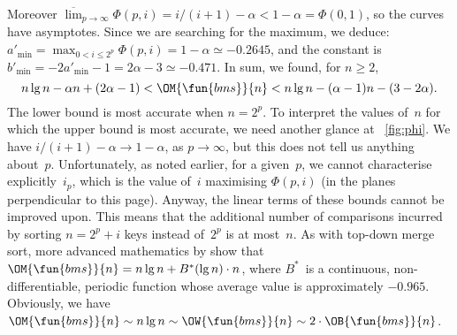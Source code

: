 Moreover \(\overline\lim_{p \to \infty}\Phi(p,i) = i/(i+1) - \alpha <
1 - \alpha = \Phi(0,1)\), so the curves have asymptotes. Since we are
searching for the maximum, we deduce: \(a'_{\min} = \max_{0 < i
  \leqslant 2^p}\Phi(p,i) = 1 - \alpha \simeq -0.2645\), and the
constant is \(b'_{\min} = -2a'_{\min} - 1 = 2\alpha - 3 \simeq
-0.471\). In sum, we found, for \(n \geqslant 2\),
\begin{equation}
n\lg n - \alpha n + (2\alpha - 1) < \OM{\fun{bms}}{n}
< n\lg n - (\alpha - 1)n - (3 - 2\alpha).
\label{ineq:bounds_Mbms}
\end{equation}
The lower bound is most accurate when \(n=2^p\). To interpret the
values of~\(n\) for which the upper bound is most accurate, we need
another glance at \fig~\vref{fig:phi}. We have \(i/(i+1) - \alpha \to
1 - \alpha\), as \(p \to \infty\), but this does not tell us anything
about~\(p\). Unfortunately, as noted earlier, for a given~\(p\), we
cannot characterise explicitly~\(i_p\), which is the value of~\(i\)
maximising \(\Phi(p,i)\) (in the planes perpendicular to this
page). Anyway, the linear terms of these bounds cannot be improved
upon. This means that the additional number of comparisons incurred by
sorting \(n=2^p+i\) keys instead of~\(2^p\) is at most~\(n\). As with
top\hyp{}down merge sort, more advanced mathematics by
\cite{PannyProdinger_1995} show that \(\OM{\fun{bms}}{n} = n\lg n +
B^*(\lg n) \cdot n\), where \(B^*\)~is
a continuous, non\hyp{}differentiable, periodic function whose average
value is approximately \(-0.965\). Obviously, we have
\(\OM{\fun{bms}}{n} \sim n\lg n \sim \OW{\fun{bms}}{n} \sim 2 \cdot
\OB{\fun{bms}}{n}\).


